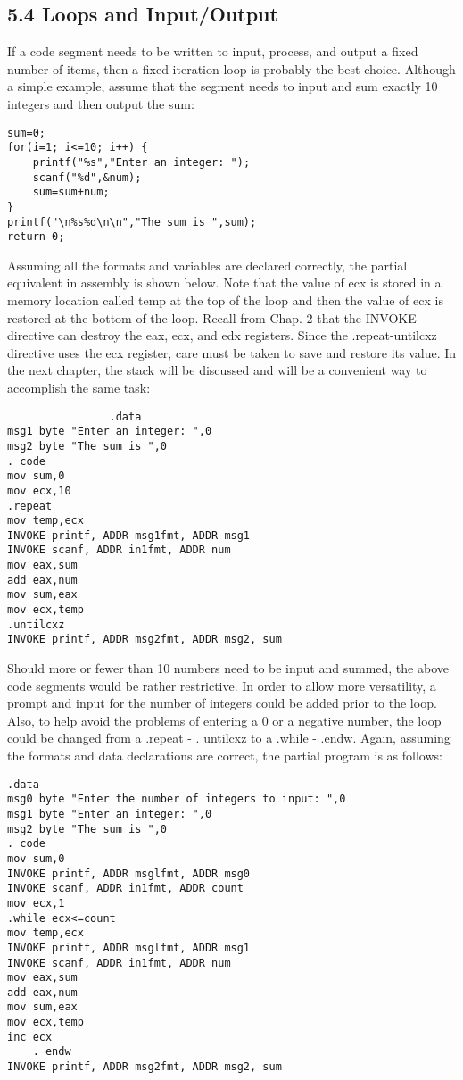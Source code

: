 \documentclass[10pt]{article}
\begin{document}
\subsection*{5.4 Loops and Input/Output}
If a code segment needs to be written to input, process, and output a fixed number of items, then a fixed-iteration loop is probably the best choice. Although a simple example, assume that the segment needs to input and sum exactly 10 integers and then output the sum:

\begin{verbatim}
sum=0;
for(i=1; i<=10; i++) {
    printf("%s","Enter an integer: ");
    scanf("%d",&num);
    sum=sum+num;
}
printf("\n%s%d\n\n","The sum is ",sum);
return 0;
\end{verbatim}

Assuming all the formats and variables are declared correctly, the partial equivalent in assembly is shown below. Note that the value of ecx is stored in a memory location called temp at the top of the loop and then the value of ecx is restored at the bottom of the loop. Recall from Chap. 2 that the INVOKE directive can destroy the eax, ecx, and edx registers. Since the .repeat-untilcxz directive uses the ecx register, care must be taken to save and restore its value. In the next chapter, the stack will be discussed and will be a convenient way to accomplish the same task:

\begin{verbatim}
                .data
msg1 byte "Enter an integer: ",0
msg2 byte "The sum is ",0
. code
mov sum,0
mov ecx,10
.repeat
mov temp,ecx
INVOKE printf, ADDR msg1fmt, ADDR msg1
INVOKE scanf, ADDR in1fmt, ADDR num
mov eax,sum
add eax,num
mov sum,eax
mov ecx,temp
.untilcxz
INVOKE printf, ADDR msg2fmt, ADDR msg2, sum
\end{verbatim}

Should more or fewer than 10 numbers need to be input and summed, the above code segments would be rather restrictive. In order to allow more versatility, a prompt and input for the number of integers could be added prior to the loop. Also, to help avoid the problems of entering a 0 or a negative number, the loop could be changed from a .repeat - . untilcxz to a .while - .endw. Again, assuming the formats and data declarations are correct, the partial program is as follows:

\begin{verbatim}
.data
msg0 byte "Enter the number of integers to input: ",0
msg1 byte "Enter an integer: ",0
msg2 byte "The sum is ",0
. code
mov sum,0
INVOKE printf, ADDR msglfmt, ADDR msg0
INVOKE scanf, ADDR in1fmt, ADDR count
mov ecx,1
.while ecx<=count
mov temp,ecx
INVOKE printf, ADDR msglfmt, ADDR msg1
INVOKE scanf, ADDR in1fmt, ADDR num
mov eax,sum
add eax,num
mov sum,eax
mov ecx,temp
inc ecx
    . endw
INVOKE printf, ADDR msg2fmt, ADDR msg2, sum
\end{verbatim}
\end{document}
